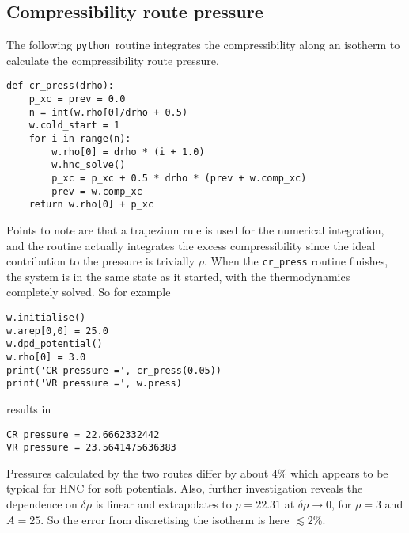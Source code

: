 \documentclass[12pt,a4paper]{article}
\newcommand{\alt}{\lesssim}
\newcommand{\python}{{\tt python}}
\begin{document}
\subsection{Compressibility route pressure}
%
The following \python\ routine integrates the compressibility along an
isotherm to calculate the compressibility route pressure,
%
\begin{verbatim}
def cr_press(drho):
    p_xc = prev = 0.0
    n = int(w.rho[0]/drho + 0.5)
    w.cold_start = 1
    for i in range(n):
        w.rho[0] = drho * (i + 1.0)
        w.hnc_solve()
        p_xc = p_xc + 0.5 * drho * (prev + w.comp_xc)
        prev = w.comp_xc
    return w.rho[0] + p_xc
\end{verbatim}
%
Points to note are that a trapezium rule is used for the numerical
integration, and the routine actually integrates the excess
compressibility since the ideal contribution to the pressure is
trivially $\rho$.  When the \verb+cr_press+ routine finishes, the
system is in the same state as it started, with the thermodynamics
completely solved.  So for example
%
\begin{verbatim}
w.initialise()
w.arep[0,0] = 25.0
w.dpd_potential()
w.rho[0] = 3.0
print('CR pressure =', cr_press(0.05))
print('VR pressure =', w.press)
\end{verbatim}
%
results in
%
\begin{verbatim}
CR pressure = 22.6662332442
VR pressure = 23.5641475636383
\end{verbatim}
%
Pressures calculated by the two routes differ by about 4\%
which appears to be typical for HNC for soft potentials.  Also,
further investigation reveals the dependence on $\delta\rho$ is linear
and extrapolates to $p=22.31$ at $\delta\rho\to0$, for $\rho=3$ and
$A=25$.  So the error from discretising the isotherm is here $\alt2$\%.
\end{document}
